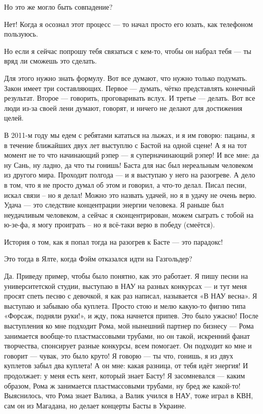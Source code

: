 Но это же могло быть совпадение?

Нет!  Когда я осознал этот процесс --- то начал просто его юзать, как телефоном
пользуюсь.

Но если я сейчас попрошу тебя связаться с кем-то, чтобы он набрал тебя --- ты
вряд ли сможешь это сделать.

Для этого нужно знать формулу. Вот все думают, что нужно только подумать. Закон
имеет три составляющих. Первое --- думать, чётко представлять конечный результат.
Второе --- говорить, проговаривать вслух. И третье --- делать. Вот все люди из-за
своей лени думают, говорят, и ничего не делают для достижения целей.

В 2011-м году мы едем с ребятами кататься на лыжах, и я им говорю: пацаны, я в
течение ближайших двух лет выступлю с Бастой на одной сцене! А я на тот момент
не то что начинающий рэпер --- я суперначинающий рэпер! И все мне: да ну Сань, ну
ладно, да что ты гонишь! Баста для нас был нереальным человеком из другого
мира. Проходит полгода --- и я выступаю у него на разогреве. А дело в том, что я
не просто думал об этом и говорил, а что-то делал. Писал песни, искал связи –
но я делал! Можно это назвать удачей, но я в удачу не очень верю. Удача --- это
следствие концентрации энергии человека. Я раньше был неудачливым человеком, а
сейчас я сконцентрирован, можем сыграть с тобой на ю-зе-фа, я могу проиграть –
но я всё-таки верю в победу (смеётся).

История о том, как я попал тогда на разогрев к Басте --- это парадокс!

Это тогда в Ялте, когда Фэйм отказался идти на Газгольдер?

Да. Приведу пример, чтобы было понятно, как это работает. Я пишу песни на
университетской студии, выступаю в НАУ на разных конкурсах --- и тут меня просят
спеть песню с девочкой, я как раз написал, называется «В НАУ весна». Я выступаю
и забываю оба куплета. Просто стою и мелю какую-то фигню типа «Форсаж, подняли
руки!», и жду, пока начнется припев. Это было ужасно! После выступления ко мне
подходит Рома, мой нынешний партнер по бизнесу --- Рома занимается вообще-то
пластмассовыми трубами, но он такой, искренний фанат творчества, спонсирует
разные конкурсы, всем помогает. Он подходит ко мне и говорит --- чувак, это было
круто! Я говорю --- ты что, гонишь, я из двух куплетов забыл два куплета! А он
мне: какая разница, от тебя идёт энергия! И продолжает: у меня есть кент,
который знает Басту! Я засомневался --- каким образом, Рома ж занимается
пластмассовыми трубами, ну бред же какой-то! Выяснилось, что Рома знает Валика,
а Валик учился в НАУ, тоже играл в КВН, сам он из Магадана, но делает концерты
Басты в Украине.

